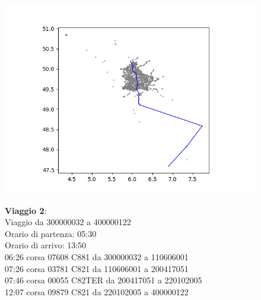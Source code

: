 \documentclass{article}
\begin{document}
\begin{figure}[H]
	\begin{minipage}{0.55\linewidth}
		\centering
		\hspace*{-6cm}\includegraphics[width=1.0\linewidth, valign=t]{figures/Figure_1}
	\end{minipage}
	\hspace*{-4cm}\begin{minipage}{0.7\linewidth}
		\textbf{Viaggio 2}:\\
		Viaggio da 300000032 a 400000122\\
		Orario di partenza: 05:30\\
		Orario di arrivo: 13:50\\
		06:26 corsa 07608 C881 da 300000032 a 110606001\\
		07:26 corsa 03781 C821 da 110606001 a 200417051\\
		07:46 corsa 00055 C82TER da 200417051 a 220102005\\
		12:07 corsa 09879 C821 da 220102005 a 400000122
		
			\end{minipage}
\end{figure}
\end{document}
